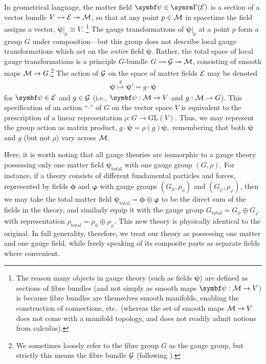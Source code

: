 In geometrical language, the matter field $\bm\psi \in \secs(\cal E)$ is a section of a vector bundle $\fibrebundle{V}{\cal E}{\cal M}$, so that at any point $p \in \cal M$ in spacetime the field assigns a vector, $\bm\psi|_p \cong V$.%
\footnote{
	The reason many objects in gauge theory (such as fields $\bm\psi$) are defined as sections of fibre bundles (and not simply as smooth maps $\bm\psi : \cal M \to V$) is because fibre bundles are themselves smooth manifolds, enabling the construction of connections, etc.\ (whereas the set of smooth maps $\cal M \to V$ does not come with a manifold topology, and does not readily admit notions from calculus).
}
The gauge transformations of $\bm\psi|_p$ at a point $p$ form a group $G$ under composition---but this group does not describe local gauge transformations which act on the \emph{entire} field $\bm\psi$.
Rather, the total space of local gauge transformations is a principle $G$-bundle $\fibrebundle{G}{\cal G}{\cal M}$, consisting of smooth maps $\cal M \to G$.\footnote{
	We sometimes loosely refer to the fibre group $G$ as the gauge group, but strictly this means the fibre bundle $\cal G$ (following \cite{Tong_lecture_notes}).
}
The action of $\cal G$ on the space of matter fields $\cal E$ may be denoted
\begin{align}
	\bm\psi \overset{g}{\mapsto} \bm\psi' = g\cdot\bm\psi
\end{align}
for $\bm\psi \in \cal E$ and $g \in \cal G$ (i.e., $\bm\psi : \cal M \to V$ and $g : \cal M \to G$).
This specification of an action ``$\cdot$'' of $G$ on the vector space $V$ is equivalent to the prescription of a linear representation $\rho : G \to \mathrm{GL}(V)$.
Thus, we may represent the group action as matrix product,
\begin{math}
	g \cdot \bm\psi = \rho(g)\bm\psi
,\end{math}
remembering that both $\bm\psi$ and $g$ (but not $\rho$) vary across $\cal M$.

Here, it is worth noting that all gauge theories are isomorphic to a gauge theory possessing only one matter field $\bm\psi_\text{total}$ with one gauge group $(G, \rho)$.
For instance, if a theory consists of different fundamental particles and forces, represented by fields $\bm\phi$ and $\bm\varphi$ with gauge groups $(G_\phi, \rho_\phi)$ and $(G_\varphi, \rho_\varphi)$,
then we may take the total matter field $\bm\psi_\text{total} = \bm\phi \oplus \bm\varphi$ to be the direct sum of the fields in the theory, and similarly equip it with the gauge group $G_\text{total} = G_\phi \oplus G_\varphi$ with representation $\rho_\text{total} = \rho_\phi \oplus \rho_\varphi$.
This new theory is physically identical to the original.
In full generality, therefore, we treat our theory as possessing one matter and one gauge field, while freely speaking of its composite parts as separate fields where convenient.


